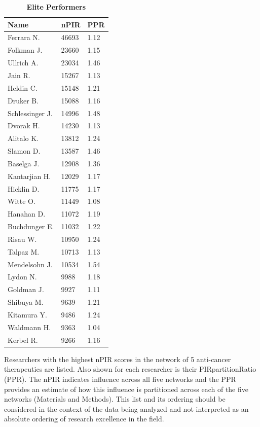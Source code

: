 \documentclass[10pt,letterpaper]{article}
\date{}
\begin{document}
\vspace*{0.2in}

\begin{table}[!ht]
\centering
\caption{
{\bf Elite Performers}}
\vspace{2.5 mm}
\begin{tabular}{|l| l| l|}
\hline
Name& nPIR & PPR \\
\hline
\hline
Ferrara N.	 & 46693 & 1.12 \\ 
Folkman J. & 23660 & 1.15 \\ 
Ullrich A. & 23034 & 1.46 \\ 
Jain R. & 15267 & 1.13 \\ 
Heldin C.	& 15148 & 1.21 \\ 
Druker B.	& 15088 & 1.16 \\ 
Schlessinger J.	& 14996 & 1.48 \\ 
Dvorak H.	 & 14230 & 1.13 \\ 
 Alitalo K.	& 13812 & 1.24 \\ 
 Slamon D. & 13587 & 1.46 \\ 
 Baselga J. & 12908 & 1.36 \\ 
 Kantarjian H. & 12029 & 1.17 \\ 
 Hicklin D.	 & 11775 & 1.17 \\ 
 Witte O. & 11449 & 1.08 \\ 
 Hanahan D. & 11072 & 1.19 \\ 
 Buchdunger E.	 & 11032 & 1.22 \\ 
 Risau W.	& 10950 & 1.24 \\ 
 Talpaz M.	 & 10713 & 1.13 \\ 
 Mendelsohn J.	 & 10534 & 1.54 \\ 
 Lydon N. & 9988 & 1.18 \\ 
 Goldman J. & 9927 & 1.11 \\ 
 Shibuya M. & 9639 & 1.21 \\ 
 Kitamura Y. & 9486 & 1.24 \\ 
 Waldmann H. & 9363 & 1.04 \\ 
 Kerbel R.	 & 9266 & 1.16 \\ 
   \hline
\end{tabular}
\vspace{2.5 mm}
\begin{flushleft} Researchers with the highest nPIR scores in the network of 5 anti-cancer therapeutics are listed. Also shown for each researcher is their PIRpartitionRatio (PPR). The nPIR indicates influence across all five networks and the PPR provides an estimate of how this influence is partitioned across each of the five networks (Materials and Methods). This list and its ordering should be considered in the context of the data being analyzed and not interpreted as an absolute ordering of research excellence in the field.
\end{flushleft}
\label{table2}
\end{table}
\end{document}
